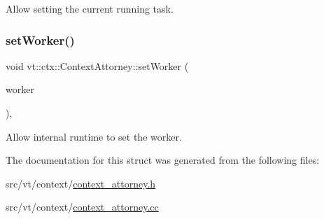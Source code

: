 Allow setting the current running task. 

\mbox{\label{structvt_1_1ctx_1_1_context_attorney_aff61a50ec309e8a225504d2f27aa48d4}} 
\subsubsection{\texorpdfstring{set\+Worker()}{setWorker()}}
{\footnotesize\ttfamily void vt\+::ctx\+::\+Context\+Attorney\+::set\+Worker (\begin{DoxyParamCaption}\item[{\hyperlink{namespacevt_a656e362091da17b9b93d0655b36e3392}{Worker\+I\+D\+Type} const}]{worker }\end{DoxyParamCaption})\hspace{0.3cm}{\ttfamily [static]}, {\ttfamily [private]}}



Allow internal runtime to set the worker. 



The documentation for this struct was generated from the following files\+:\begin{DoxyCompactItemize}
\item 
src/vt/context/\hyperlink{context__attorney_8h}{context\+\_\+attorney.\+h}\item 
src/vt/context/\hyperlink{context__attorney_8cc}{context\+\_\+attorney.\+cc}\end{DoxyCompactItemize}
